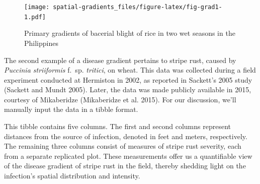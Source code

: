 \documentclass[
  letterpaper,
]{book}
\begin{document}
\begin{figure}

{\centering \texttt{[image: spatial-gradients\_files/figure-latex/fig-grad1-1.pdf]}

}

\caption{\label{fig-grad1}Primary gradients of bacerial blight of rice
in two wet seasons in the Philippines}

\end{figure}

The second example of a disease gradient pertains to stripe rust, caused
by \emph{Puccinia striiformis} f.~sp. \emph{tritici}, on wheat. This
data was collected during a field experiment conducted at Hermiston in
2002, as reported in Sackett's 2005 study (Sackett and Mundt 2005).
Later, the data was made publicly available in 2015, courtesy of
Mikaberidze (Mikaberidze et al. 2015). For our discussion, we'll
manually input the data in a tibble format.

This tibble contains five columns. The first and second columns
represent distances from the source of infection, denoted in feet and
meters, respectively. The remaining three columns consist of measures of
stripe rust severity, each from a separate replicated plot. These
measurements offer us a quantifiable view of the disease gradient of
stripe rust in the field, thereby shedding light on the infection's
spatial distribution and intensity.
\end{document}
